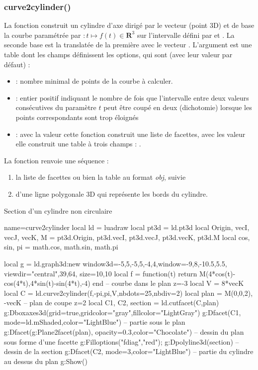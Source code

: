 \subsubsection{curve2cylinder()}
La fonction  construit un cylindre d'axe dirigé par le vecteur  (point 3D) et de base la courbe paramétrée par $\colon t\mapsto f(t)\in\mathbf R^3$ sur l'intervalle défini par  et . La seconde base est la translatée de la première avec le vecteur . L'argument  est une table dont les champs définissent les options, qui sont (avec leur valeur  par défaut) :
    \begin{itemize}
        \item {} : nombre minimal de points de la courbe à calculer.
        
        \item {} : entier positif indiquant le nombre de fois que l'intervalle entre deux valeurs consécutives du paramètre $t$ peut être coupé en deux (dichotomie) lorsque les points correspondants sont trop éloignés
        
        \item {} : avec la valeur \false cette fonction construit une liste de facettes, avec les valeur \true elle construit une table à trois champs : .
    \end{itemize}
La fonction renvoie une séquence : 
\begin{enumerate}
    \item la liste de facettes ou bien la table au format \emph{obj}, suivie 
    \item d'une ligne polygonale 3D qui représente les bords du cylindre.
\end{enumerate}
 
\begin{demo}{Section d'un cylindre non circulaire}
\begin{luadraw}{name=curve2cylinder}
local ld = luadraw
local pt3d = ld.pt3d
local Origin, vecI, vecJ, vecK, M = pt3d.Origin, pt3d.vecI, pt3d.vecJ, pt3d.vecK, pt3d.M
local cos, sin, pi = math.cos, math.sin, math.pi

local g = ld.graph3d:new{ window3d={-5,5,-5,5,-4,4},window={-9,8,-10.5,5.5},
    viewdir={"central",39,64}, size={10,10}}
local f = function(t) return M(4*cos(t)-cos(4*t),4*sin(t)-sin(4*t),-4) end -- courbe dans le plan z=-3
local V = 8*vecK
local C = ld.curve2cylinder(f,-pi,pi,V,{nbdots=25,nbdiv=2})
local plan = {M(0,0,2), -vecK} -- plan de coupe z=2
local C1, C2, section = ld.cutfacet(C,plan)
g:Dboxaxes3d({grid=true,gridcolor="gray",fillcolor="LightGray"})
g:Dfacet(C1, {mode=ld.mShaded,color="LightBlue"}) -- partie sous le plan
g:Dfacet(g:Plane2facet(plan), {opacity=0.3,color="Chocolate"}) -- dessin du plan sous forme d'une facette
g:Filloptions("fdiag","red"); g:Dpolyline3d(section) -- dessin de la section
g:Dfacet(C2, {mode=3,color="LightBlue"}) -- partie du cylindre au dessus du plan
g:Show()
\end{luadraw}
\end{demo}

